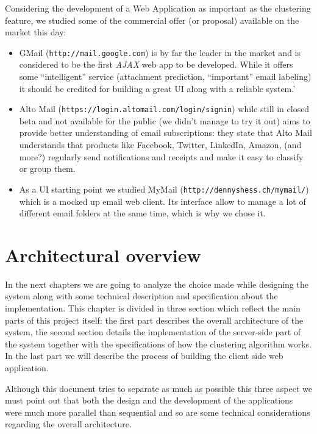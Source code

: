 \documentclass[a4paper,12pt]{report}
\begin{document}
Considering the development of a Web Application as important as the clustering feature, we studied some of the commercial offer (or proposal) available on the market this day:
\begin{itemize}
\item GMail (\texttt{http://mail.google.com}) is by far the leader in the market and is considered to be the first \emph{AJAX} web app to be developed. While it offers some ``intelligent'' service (attachment prediction, ``important'' email labeling) it should be credited for building a great UI along with a reliable system.'
\item Alto Mail (\texttt{https://login.altomail.com/login/signin}) while still in closed beta and not available for the public (we didn't manage to try it out) aims to provide better understanding of email subscriptions: they state that Alto Mail understands that products like Facebook, Twitter, LinkedIn, Amazon, (and more?) regularly send notifications and receipts and make it easy to classify or group them. 
\item As a UI starting point we studied MyMail (\texttt{http://dennyshess.ch/mymail/}) which is a mocked up email web client. Its interface allow to manage a lot of different email folders at the same time, which is why we chose it.
\end{itemize}


\chapter{Architectural overview}
In the next chapters we are going to analyze the choice made while designing the system along with some technical description and specification about the implementation. This chapter is divided in three section which reflect the main parts of this project itself: the first part describes the overall architecture of the system, the second section details the implementation of the server-side part of the system together with the specifications of how the clustering algorithm works. In the last part we will describe the process of building the client side web application.

Although this document tries to separate as much as possible this three aspect we must point out that both the design and the development of the applications were much more parallel than sequential and so are some technical considerations regarding the overall architecture.
\end{document}
